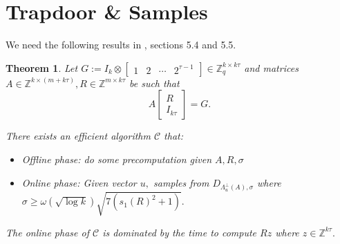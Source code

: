 \documentclass[11pt]{article}
\newcommand{\poly}[2]{{#1}^{<#2}[x]}
\newcommand{\negl}[1]{\text{negl}(#1)}
\newcommand{\Z}{\mathbb{Z}}
\newtheorem{theorem}{Theorem}[section]
\begin{document}
\section{Trapdoor \& Samples}
       
         
        
       
     We need the following results in \cite{MP}, sections 5.4 and 5.5.
     \begin{theorem} \label{thm:Gausssample}
     Let $G:=I_k \otimes \begin{bmatrix} 1 & 2 & \cdots & 2^{\tau-1} \end{bmatrix} \in \Z_q^{k \times k \tau}$ and matrices $A \in \Z^{k \times (m+k\tau)}, R \in \Z^{m\times k\tau}$ be such that $$A \begin{bmatrix} R \\ I_{k\tau} \end{bmatrix} = G.$$
     
     There exists an efficient algorithm $\mathcal{C}$ that:
     \begin{itemize}
         \item Offline phase: do some precomputation given $A, R, \sigma$
         \item Online phase: Given vector $u,$ samples from $D_{\Lambda^{\perp}_u (A), \sigma}$ where $\sigma \geq \omega (\sqrt{\log k})\sqrt{7(s_1(R)^2 +1) }.$
     \end{itemize}
     
     The online phase of $\mathcal{C}$ is dominated by the time to compute $R z$ where $z \in \Z^{k \tau}.$
     \end{theorem}
     
\end{document}
